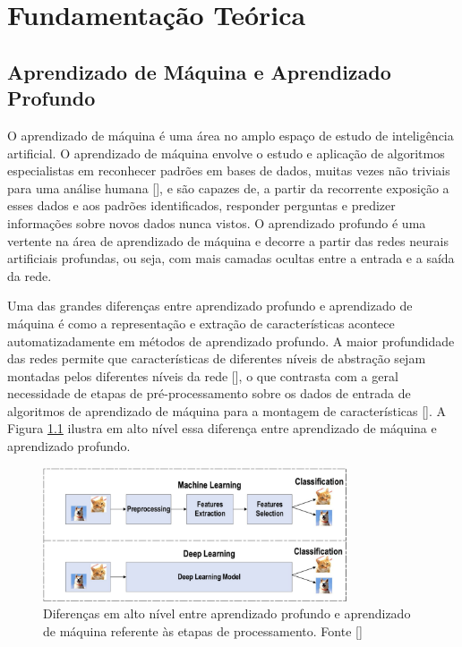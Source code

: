 \chapter{Fundamentação Teórica}

\section{Aprendizado de Máquina e Aprendizado Profundo}
O aprendizado de máquina é uma área no amplo espaço de estudo de inteligência artificial. O aprendizado de máquina 
envolve o estudo e aplicação de algoritmos especialistas em reconhecer padrões em bases de dados, muitas vezes não 
triviais para uma análise humana [], e são capazes de, a partir da recorrente exposição a 
esses dados e aos padrões identificados, responder perguntas e predizer informações sobre novos dados nunca vistos. 
O aprendizado profundo é uma vertente na área de aprendizado de máquina e decorre a partir das redes neurais artificiais 
profundas, ou seja, com mais camadas ocultas entre a entrada e a saída da rede.

Uma das grandes diferenças entre aprendizado profundo e aprendizado de máquina é como a representação e extração de 
características acontece automatizadamente em métodos de aprendizado profundo. A maior profundidade das redes permite 
que características de diferentes níveis de abstração sejam montadas pelos diferentes níveis da rede 
[], o que contrasta com a geral necessidade de etapas de pré-processamento sobre os 
dados de entrada de algoritmos de aprendizado de máquina para a montagem de características []. 
A Figura \ref{fig:dl_vs_ml} ilustra em alto nível essa diferença entre aprendizado de máquina e aprendizado profundo.

\begin{figure}
    \centering
    \includegraphics[width=0.8\textwidth]{figs/theory-ml-vs-dl.png}
    \caption{Diferenças em alto nível entre aprendizado profundo e aprendizado de máquina referente às etapas de processamento. Fonte []}
    \label{fig:dl_vs_ml}
\end{figure}


